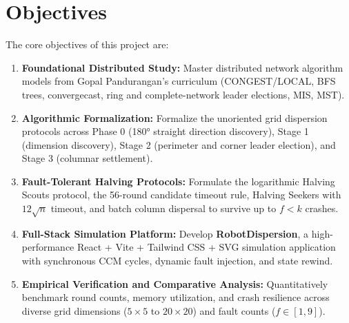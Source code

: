 \documentclass[11pt,a4paper]{report}
\begin{document}
\section{Objectives}
The core objectives of this project are:
\begin{enumerate}
    \item \textbf{Foundational Distributed Study:} Master distributed network algorithm models from Gopal Pandurangan's curriculum (CONGEST/LOCAL, BFS trees, convergecast, ring and complete-network leader elections, MIS, MST).
    \item \textbf{Algorithmic Formalization:} Formalize the unoriented grid dispersion protocols across Phase 0 (180° straight direction discovery), Stage 1 (dimension discovery), Stage 2 (perimeter and corner leader election), and Stage 3 (columnar settlement).
    \item \textbf{Fault-Tolerant Halving Protocols:} Formulate the logarithmic Halving Scouts protocol, the 56-round candidate timeout rule, Halving Seekers with $12\sqrt{n}$ timeout, and batch column dispersal to survive up to $f < k$ crashes.
    \item \textbf{Full-Stack Simulation Platform:} Develop \textbf{RobotDispersion}, a high-performance React + Vite + Tailwind CSS + SVG simulation application with synchronous CCM cycles, dynamic fault injection, and state rewind.
    \item \textbf{Empirical Verification and Comparative Analysis:} Quantitatively benchmark round counts, memory utilization, and crash resilience across diverse grid dimensions ($5 \times 5$ to $20 \times 20$) and fault counts ($f \in [1, 9]$).
\end{enumerate}
\end{document}
